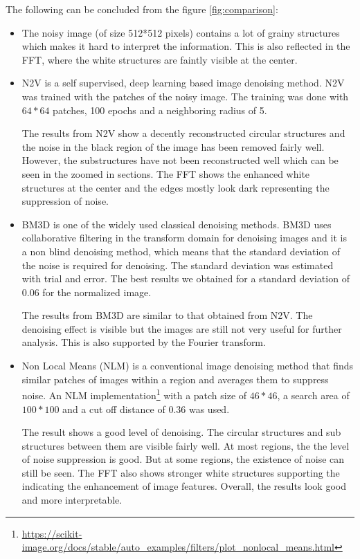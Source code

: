 \documentclass[fleqn,10pt]{wlscirep}
\begin{document}
	The following can be concluded from the figure \ref{fig:comparison}:
	\begin{itemize}
		\item The noisy image (of size 512*512 pixels) contains a lot of grainy structures which makes it hard to interpret the information. This is also reflected in the FFT, where the white structures are faintly visible at the center.
		
		\item N2V\cite{krull2019noise2void} is a self supervised, deep learning based image denoising method. N2V was trained with the patches of the noisy image. The training was done with $64*64$ patches, 100 epochs and a neighboring radius of 5. 
		
		The results from N2V show a decently reconstructed circular structures and the noise in the black region of the image has been removed fairly well. However, the substructures have not been reconstructed well which can be seen in the zoomed in sections. The FFT shows the enhanced white structures at the center and the edges mostly look dark representing the suppression of noise. 
		
		\item BM3D \cite{DBLP:journals/tip/BM3D} is one of the widely used classical denoising methods. BM3D uses collaborative filtering in the transform domain for denoising images and it is a non blind denoising method, which means that the standard deviation of the noise is required for denoising. The standard deviation was estimated with trial and error. The best results we obtained for a standard deviation of 0.06 for the normalized image.
		
		The results from BM3D are similar to that obtained from N2V. The denoising effect is visible but the images are still not very useful for further analysis. This is also supported by the Fourier transform.
		
		\item Non Local Means (NLM) \cite{bcm_nlm} is a conventional image denoising method that finds similar patches of images within a region and averages them to suppress noise. An NLM implementation\footnote{\url{https://scikit-image.org/docs/stable/auto_examples/filters/plot_nonlocal_means.html}} with a patch size of $46*46$, a search area of $100*100$ and a cut off distance of 0.36 was used. 
		
		The result shows a good level of denoising. The circular structures and sub structures between them are visible fairly well. At most regions, the the level of noise suppression is good. But at some regions, the existence of noise can still be seen. The FFT also shows stronger white structures supporting the indicating the enhancement of image features. Overall, the results look good and more interpretable. 
		

\end{itemize}
\end{document}

